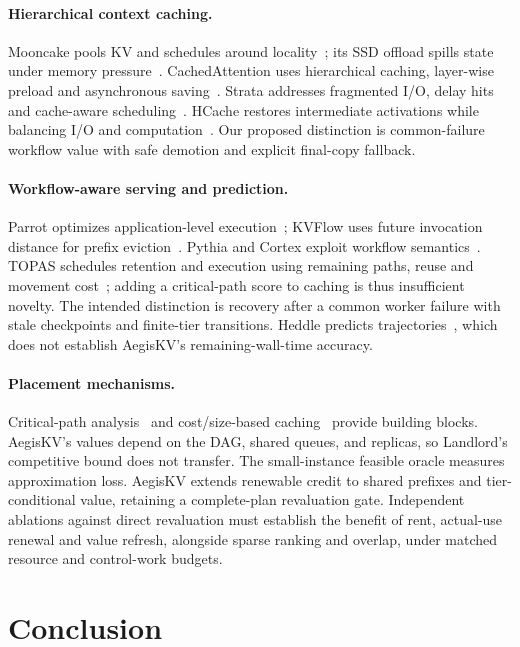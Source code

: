 \documentclass[sigplan,10pt,anonymous,nonacm]{acmart}
\begin{document}
\paragraph{Hierarchical context caching.}
Mooncake pools KV and schedules around locality~\cite{qin2025mooncake};
its SSD offload spills state under memory pressure~\cite{mooncake2026ssdoffload}.
CachedAttention uses hierarchical caching, layer-wise preload and
asynchronous saving~\cite{gao2024cachedattention}. Strata addresses
fragmented I/O, delay hits and cache-aware scheduling~\cite{xie2026strata}.
HCache restores intermediate activations while balancing I/O and
computation~\cite{gao2025hcache}. Our proposed distinction is common-failure workflow value
with safe demotion and explicit final-copy fallback.

\paragraph{Workflow-aware serving and prediction.}
Parrot optimizes application-level execution~\cite{lin2024parrot}; KVFlow
uses future invocation distance for prefix eviction~\cite{pan2025kvflow}.
Pythia and Cortex exploit workflow semantics~\cite{yu2026pythia,pagonas2025cortex}.
TOPAS schedules retention and execution using remaining paths, reuse and
movement cost~\cite{ni2026topas}; adding a critical-path score to caching
is thus insufficient novelty. The intended distinction is recovery after
a common worker failure with stale checkpoints and finite-tier transitions.
Heddle predicts trajectories~\cite{zhang2026heddle}, which does not establish
AegisKV's remaining-wall-time accuracy.

\paragraph{Placement mechanisms.}
Critical-path analysis~\cite{kelley1959cpm} and cost/size-based caching~\cite{young2002landlord}
provide building blocks. AegisKV's values depend on the DAG, shared queues,
and replicas, so Landlord's competitive bound does not transfer. The
small-instance feasible oracle measures approximation loss. AegisKV
extends renewable credit to shared prefixes and tier-conditional value,
retaining a complete-plan revaluation gate. Independent ablations against
direct revaluation must establish the benefit of rent, actual-use renewal
and value refresh, alongside sparse ranking and overlap, under matched
resource and control-work budgets.

\section{Conclusion}
\label{sec:conclusion}
\end{document}

